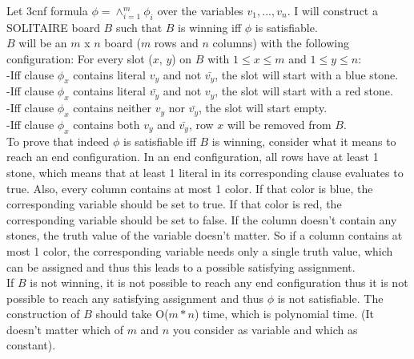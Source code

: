 \documentclass{article}
\begin{document}
Let 3cnf formula $\phi = \wedge_{i = 1}^m \phi_i$ over the variables $v_1, ..., v_n$.
I will construct a SOLITAIRE board $B$ such that $B$ is winning iff $\phi$ is satisfiable.\\
$B$ will be an $m$ x $n$ board ($m$ rows and $n$ columns) with the following configuration: 
For every slot ($x$, $y$) on $B$ with $1 \leq x \leq m$ and $1 \leq y \leq n$:\\
-Iff clause $\phi_x$ contains literal $v_y$ and not $\bar{v_y}$, the slot will start with a blue stone.\\
-Iff clause $\phi_x$ contains literal $\bar{v_y}$ and not $v_y$, the slot will start with a red stone.\\
-Iff clause $\phi_x$ contains neither $v_y$ nor $\bar{v_y}$, the slot will start empty.\\
-Iff clause $\phi_x$ contains both $v_y$ and $\bar{v_y}$, row $x$ will be removed from $B$.\\
To prove that indeed $\phi$ is satisfiable iff $B$ is winning, consider what it means to reach an end configuration.
In an end configuration, all rows have at least 1 stone, which means that at least 1 literal in its corresponding clause evaluates to true.
Also, every column contains at most 1 color. If that color is blue, the corresponding variable should be set to true.
If that color is red, the corresponding variable should be set to false. If the column doesn't contain any stones,
the truth value of the variable doesn't matter. So if a column contains at most 1 color, 
the corresponding variable needs only a single truth value, which can be assigned and thus this leads to a possible satisfying assignment.\\
If $B$ is not winning, it is not possible to reach any end configuration thus it is not possible to reach any satisfying assignment and
thus $\phi$ is not satisfiable. The construction of $B$ should take O($m * n$) time, which is polynomial time. (It doesn't matter which 
of $m$ and $n$ you consider as variable and which as constant).
\end{document}

